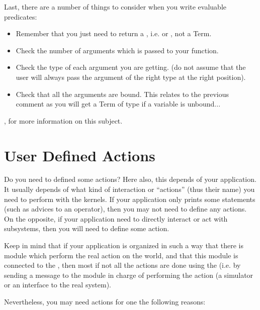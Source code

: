 Last, there are a number of things to consider when you write evaluable
predicates:

\begin{itemize}

\item Remember that you just need to return a , i.e.
 or , not a Term.

\item Check the number of arguments which is passed to your function.

\item Check the type of each argument you are getting. (do not assume
that the user will always pass the argument of the right type at the
right position).

\item Check that all the arguments are bound. This relates to the previous
comment as you will get a Term of type  if a variable is
unbound...

\end{itemize}

, for more information
on this subject.

\section{User Defined Actions}

Do you need to defined some actions? Here also, this depends of your
application. It usually depends of what kind of interaction or
``actions'' (thus their name) you need to perform with the kernels.
If your application only prints some statements (such as advices to an
operator), then you may not need to define any actions. On the opposite,
if your application need to directly interact or act with subsystems,
then you will need to define some action.

Keep in mind that if your application is organized in such a way that
there is module which perform the real action on the world, and that this
module is connected to the \MPA{}, then most if not all the actions are
done using the \MPA{} (i.e. by sending a message to the module in charge
of performing the action (a simulator or an interface to the real system).

Nevertheless, you may need actions for one the following reasons:

